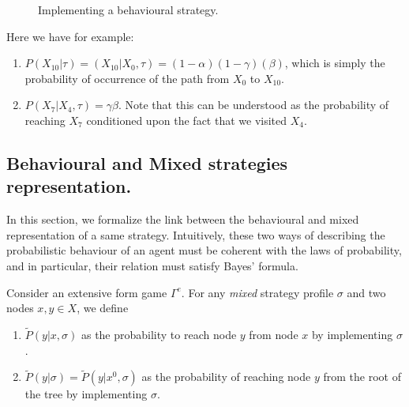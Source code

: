 \begin{example}
\begin{figure}[!ht]
\begin{center}
\label{ch4:fig:exampleFormalism2}
\end{center}
\caption{Implementing a behavioural strategy.}
\label{ch4:fig:ExtFormProba}
\end{figure}
Here we have for example:
\begin{enumerate}
\item $P(X_{10} | \tau) = (X_{10} | X_0, \tau) = (1-\alpha)  (1-\gamma) (\beta)$, which is simply the probability of occurrence of the path from $X_0$ to $X_{10}$.
\item $P(X_7 | X_4,\tau ) = \gamma \beta$. Note that this can be understood as the probability of reaching $X_7$ conditioned upon the fact that we visited $X_4$.
\end{enumerate}
\end{example}

\subsection{Behavioural and Mixed strategies representation.}

In this section, we formalize the link between the behavioural and mixed representation of a same strategy.
Intuitively, these two ways of describing the probabilistic behaviour of an agent must be coherent with the laws of probability, and in particular, their relation must satisfy Bayes' formula.
\begin{definition}
Consider an extensive form game $\Gamma^e$. For any \emph{mixed} strategy profile $\sigma$ and two nodes $x,y \in X$, we define
\begin{enumerate}
\item $\tilde P(y | x, \sigma)$ as the probability to reach node $y$ from node $x$ by implementing $\sigma$.
\item $ \tilde P(y|\sigma) = \tilde P(y | x^0, \sigma)$ as the probability of reaching node $y$ from the root of the tree by implementing $\sigma$.
\end{enumerate}
\end{definition}

